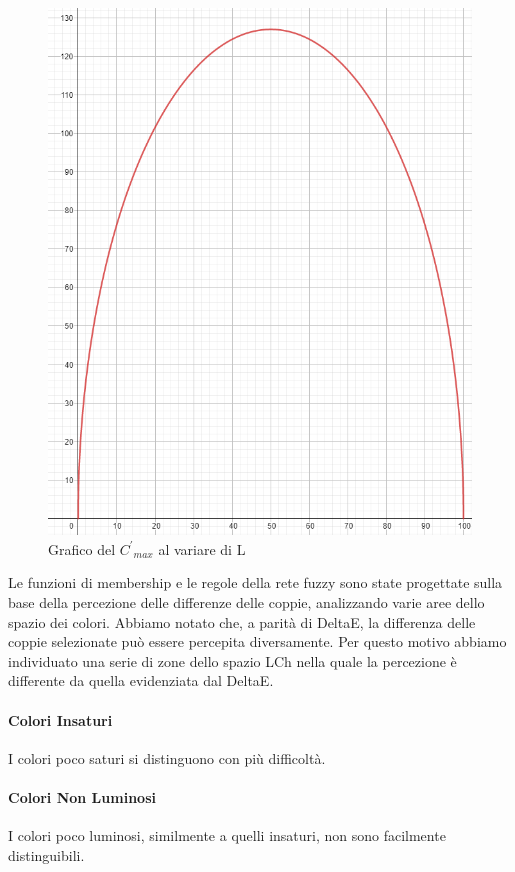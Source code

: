 \begin{figure}[!ht]
\begin{center}
	\includegraphics[scale=0.5]{images/geogebra-export.png}
\end{center}
\caption{Grafico del \({C^{'}}_{max}\) al variare di L}
\end{figure}

Le funzioni di membership e le regole della rete fuzzy sono state progettate sulla base della percezione delle differenze delle coppie, analizzando varie aree dello spazio dei colori. Abbiamo notato che, a parità di DeltaE, la differenza delle coppie selezionate può essere percepita diversamente. Per questo motivo abbiamo individuato una serie di zone dello spazio LCh nella quale la percezione è differente da quella evidenziata dal DeltaE.

\paragraph{Colori Insaturi} I colori poco saturi si distinguono con più difficoltà.
\paragraph{Colori Non Luminosi} I colori poco luminosi, similmente a quelli insaturi, non sono facilmente distinguibili.
